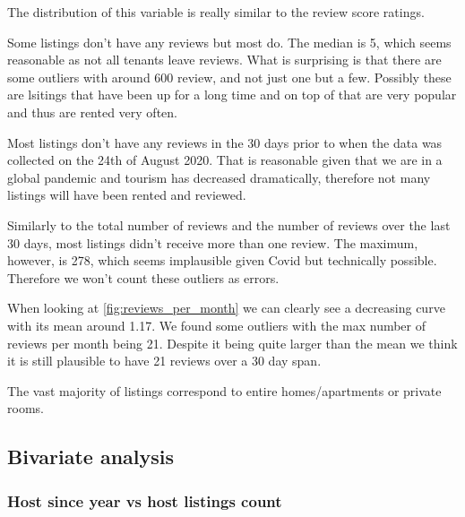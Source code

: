 The distribution of this variable is really similar to the review score ratings.




Some listings don't have any reviews but most do. The median is 5,
which seems reasonable as not all tenants leave reviews. What is
surprising is that there are some outliers with around 600 review,
and not just one but a few. Possibly these are lsitings that have been
up for a long time and on top of that are very popular and thus
are rented very often.


Most listings don't have any reviews in the 30 days prior to
when the data was collected on the 24th of August 2020. 
That is reasonable given that we are
in a global pandemic and tourism has decreased dramatically, therefore
not many \airbnb listings will have been rented and reviewed.



Similarly to the total number of reviews and the number of reviews
over the last 30 days, most listings didn't receive more than one
review. The maximum, however, is 278, which seems implausible given
Covid but technically possible. Therefore we won't count these 
outliers as errors.


When looking at \cref{fig:reviews_per_month} we can clearly see a decreasing
curve with its mean around 1.17. We found some outliers with the max number of
reviews per month being 21. Despite it being quite larger than the mean we think
it is still plausible to have 21 reviews over a 30 day span.


The vast majority of listings correspond to entire homes/apartments or private
rooms.

\pagebreak
\subsection{Bivariate analysis}%
\label{sub:bivariate_analysis}

\subsubsection{Host since year vs host listings count}

